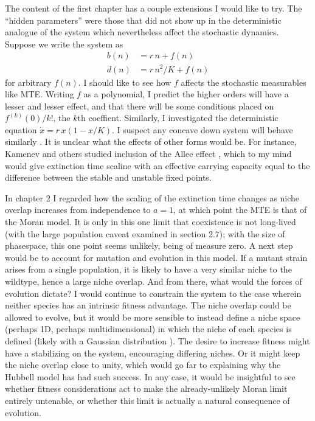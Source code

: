 The content of the first chapter has a couple extensions I would like to try. 
The ``hidden parameters'' were those that did not show up in the deterministic analogue of the system which nevertheless affect the stochastic dynamics. 
Suppose we write the system as
\begin{align*}
	b(n) &= r\,n + f(n) \\
	d(n) &= r\,n^2/K + f(n)
\end{align*}
for arbitrary $f(n)$. I should like to see how $f$ affects the stochastic measurables like MTE. 
Writing $f$ as a polynomial, I predict the higher orders will have a lesser and lesser effect, and that there will be some conditions placed on $f^{(k)}(0)/k!$, the $k$th coeffient. 
Similarly, I investigated the deterministic equation $\dot{x} = r\,x(1-x/K)$. I suspect any concave down system will behave similarly \cite{Strogatz?}. %
It is unclear what the effects of other forms would be. 
For instance, Kamenev and others studied inclusion of the Allee effect \cite{Kamenev?}, which to my mind would give extinction time scaline with an effective carrying capacity equal to the difference between the stable and unstable fixed points. 

In chapter 2 I regarded how the scaling of the extinction time changes as niche overlap increases from independence to $a=1$, at which point the MTE is that of the Moran model. 
It is only in this one limit that coexistence is not long-lived (with the large population caveat examined in section 2.7); with the size of phasespace, this one point seems unlikely, being of measure zero. 
A next step would be to account for mutation and evolution in this model. 
If a mutant strain arises from a single population, it is likely to have a very similar niche to the wildtype, hence a large niche overlap. 
And from there, what would the forces of evolution dictate? I would continue to constrain the system to the case wherein neither species has an intrinsic fitness advantage. 
The niche overlap could be allowed to evolve, but it would be more sensible to instead define a niche space (perhaps 1D, perhaps multidimensional) in which the niche of each species is defined (likely with a Gaussian distribution \cite{MacArthur}). 
The desire to increase fitness might have a stabilizing on the system, encouraging differing niches. Or it might keep the niche overlap close to unity, which would go far to explaining why the Hubbell model has had such success. 
In any case, it would be insightful to see whether fitness considerations act to make the already-unlikely Moran limit entirely untenable, or whether this limit is actually a natural consequence of evolution. 

